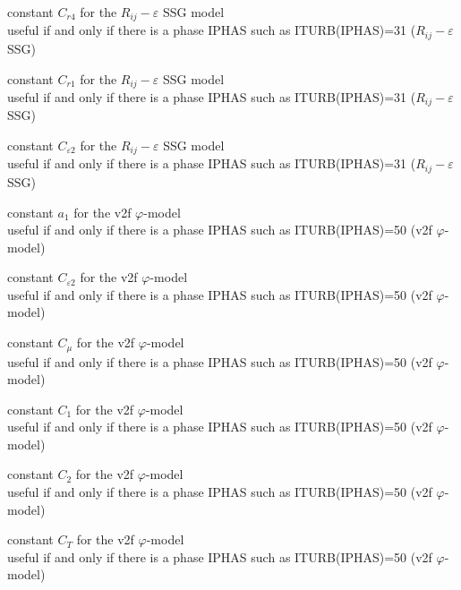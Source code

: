 {constant $C_{r4}$ for the $R_{ij}-\varepsilon$ SSG model\\
useful if and only if there is a phase IPHAS such as ITURB(IPHAS)=31
($R_{ij}-\varepsilon$ SSG)}

{constant $C_{r1}$ for the $R_{ij}-\varepsilon$ SSG model\\
useful if and only if there is a phase IPHAS such as ITURB(IPHAS)=31
($R_{ij}-\varepsilon$ SSG)}

{constant $C_{\varepsilon 2}$ for the $R_{ij}-\varepsilon$ SSG model\\
useful if and only if there is a phase IPHAS such as ITURB(IPHAS)=31
($R_{ij}-\varepsilon$ SSG)}


{constant $a_1$ for the v2f $\varphi$-model\\
useful if and only if there is a phase IPHAS such as ITURB(IPHAS)=50
(v2f $\varphi$-model)}

{constant $C_{\varepsilon 2}$ for the v2f $\varphi$-model\\
useful if and only if there is a phase IPHAS such as ITURB(IPHAS)=50
(v2f $\varphi$-model)}

{constant $C_\mu$ for the v2f $\varphi$-model\\
useful if and only if there is a phase IPHAS such as ITURB(IPHAS)=50
(v2f $\varphi$-model)}

{constant $C_1$ for the v2f $\varphi$-model\\
useful if and only if there is a phase IPHAS such as ITURB(IPHAS)=50
(v2f $\varphi$-model)}

{constant $C_2$ for the v2f $\varphi$-model\\
useful if and only if there is a phase IPHAS such as ITURB(IPHAS)=50
(v2f $\varphi$-model)}

{constant $C_T$ for the v2f $\varphi$-model\\
useful if and only if there is a phase IPHAS such as ITURB(IPHAS)=50
(v2f $\varphi$-model)}

